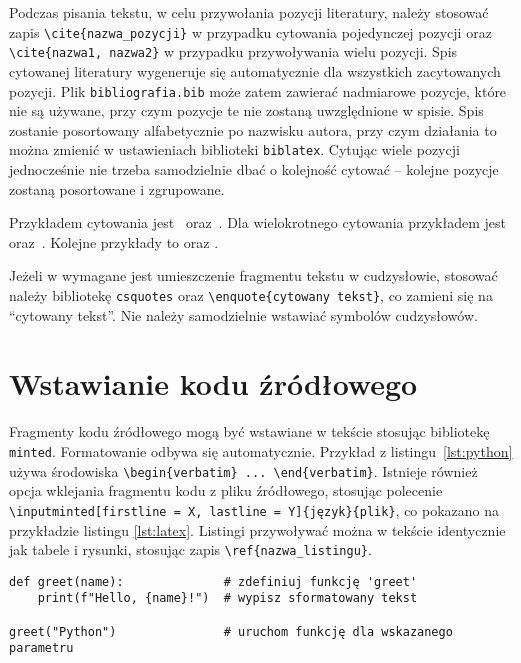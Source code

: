 Podczas pisania tekstu, w celu przywołania pozycji literatury, należy stosować zapis \verb|\cite{nazwa_pozycji}| w przypadku cytowania pojedynczej pozycji oraz \verb|\cite{nazwa1, nazwa2}| w przypadku przywoływania wielu pozycji. Spis cytowanej literatury wygeneruje się automatycznie dla wszystkich zacytowanych pozycji. Plik \texttt{bibliografia.bib} może zatem zawierać nadmiarowe pozycje, które nie są używane, przy czym pozycje te nie zostaną uwzględnione w spisie. Spis zostanie posortowany alfabetycznie po nazwisku autora, przy czym działania to można zmienić w ustawieniach biblioteki \texttt{biblatex}. Cytując wiele pozycji jednocześnie nie trzeba samodzielnie dbać o kolejność cytować -- kolejne pozycje zostaną posortowane i zgrupowane.

Przykładem cytowania jest~\cite{ksiazka_1} oraz~\cite{rozdzial_ksiazki_2}. Dla wielokrotnego cytowania przykładem jest~\cite{materialy_konferencyjne_3, artykul_4, raport_5} oraz~\cite{ksiazka_1, teza_8, materialy_konferencyjne_3, artykul_4, raport_5, instrukcja_6}. Kolejne przykłady to \cite{instrukcja_6} oraz \cite{strona_7, teza_8}.

Jeżeli w wymagane jest umieszczenie fragmentu tekstu w cudzysłowie, stosować należy bibliotekę \texttt{csquotes} oraz \verb|\enquote{cytowany tekst}|, co zamieni się na \enquote{cytowany tekst}. Nie należy samodzielnie wstawiać symbolów cudzysłowów.

\section{Wstawianie kodu źródłowego}

Fragmenty kodu źródłowego mogą być wstawiane w tekście stosując bibliotekę \texttt{minted}. Formatowanie odbywa się automatycznie. Przykład z listingu~\ref{lst:python} używa środowiska \verb|\begin{verbatim} ... \end{verbatim}|. Istnieje również opcja wklejania fragmentu kodu z pliku źródłowego, stosując polecenie \verb|\inputminted[firstline = X, lastline = Y]{język}{plik}|, co pokazano na przykładzie listingu \ref{lst:latex}. Listingi przywoływać można w tekście identycznie jak tabele i rysunki, stosując zapis \verb|\ref{nazwa_listingu}|.

\begin{listing}[ht!]
\begin{verbatim}
def greet(name):              # zdefiniuj funkcję 'greet'
    print(f"Hello, {name}!")  # wypisz sformatowany tekst

greet("Python")               # uruchom funkcję dla wskazanego parametru
\end{verbatim}
\end{listing}

